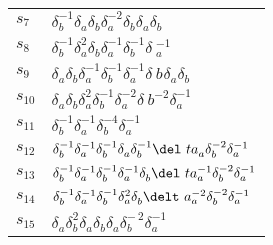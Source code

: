 \documentclass{article}
\begin{document}
\begin{center}
\begin{tabular}{ll}
$s_{7}$ & $\delta_b^{-1}\delta_a^{}\delta_b^{}\delta_a^{-2}\delta_b^{}\delta_a^\
{}\delta_b^{}$ \\
$s_{8}$ & $\delta_b^{-1}\delta_a^{2}\delta_b^{}\delta_a^{-1}\delta_b^{-1}\delta\
_a^{-1}$ \\
$s_{9}$ & $\delta_a^{}\delta_b^{}\delta_a^{-1}\delta_b^{-1}\delta_a^{-1}\delta_\
b^{}\delta_a^{}\delta_b^{}$ \\
$s_{10}$ & $\delta_a^{}\delta_b^{}\delta_a^{2}\delta_b^{-1}\delta_a^{-2}\delta_\
b^{-2}\delta_a^{-1}$ \\
$s_{11}$ & $\delta_b^{-1}\delta_a^{-1}\delta_b^{-4}\delta_a^{-1}$ \\
$s_{12}$ & $\delta_b^{-1}\delta_a^{-1}\delta_b^{-1}\delta_a^{}\delta_b^{-1}\del\
ta_a^{}\delta_b^{-2}\delta_a^{-1}$ \\
$s_{13}$ & $\delta_b^{-1}\delta_a^{-1}\delta_b^{-1}\delta_a^{-1}\delta_b^{}\del\
ta_a^{-1}\delta_b^{-2}\delta_a^{-1}$ \\
$s_{14}$ & $\delta_b^{-1}\delta_a^{-1}\delta_b^{-1}\delta_a^{2}\delta_b^{}\delt\
a_a^{-2}\delta_b^{-2}\delta_a^{-1}$ \\
$s_{15}$ & $\delta_a^{}\delta_b^{2}\delta_a^{}\delta_b^{}\delta_a^{}\delta_b^{-\
2}\delta_a^{-1}$ \\
\bottomrule
\end{tabular}
\end{center}

\thispagestyle{empty}
\end{document}
